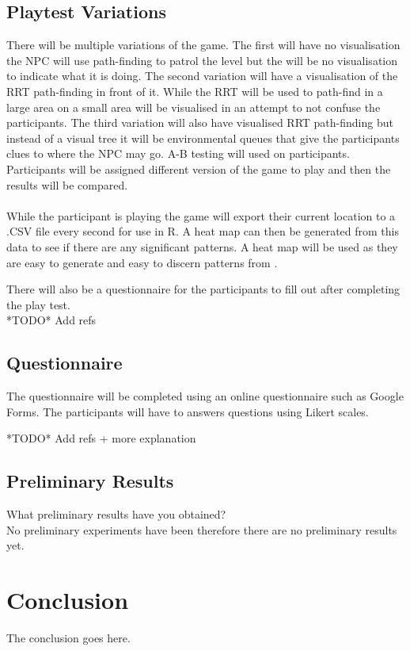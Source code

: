 \documentclass[journal]{IEEEtran}
\begin{document}
\subsection{Playtest Variations}
There will be multiple variations of the game. The first will have no visualisation the NPC will use path-finding to patrol the level but the will be no visualisation to indicate what it is doing.  The second variation will have a visualisation of the RRT path-finding in front of it. While the RRT will be used to path-find in a large area on a small area will be visualised in an attempt to not confuse the participants. The third variation will also have visualised RRT path-finding but instead of a visual tree it will be environmental queues that give the participants clues to where the NPC may go. A-B testing will used on participants. Participants will be assigned different version of the game to play and then the results will be compared. \\
\\
While the participant is playing the game will export their current location to a .CSV file every second for use in R. A heat map can then be generated from this data to see if there are any significant patterns. A heat map will be used as they are easy to generate and easy to discern patterns from \cite{Wallner2015}.

There will also be a questionnaire for the participants to fill out after completing the play test.\\

*TODO* Add refs

\subsection{Questionnaire}
The questionnaire will be completed using an online questionnaire such as Google Forms. The participants will have to answers questions using Likert scales.

*TODO* Add refs + more explanation




\subsection{Preliminary Results}
What preliminary results have you obtained? \\
No preliminary experiments have been therefore there are no preliminary results yet.


\section{Conclusion}
The conclusion goes here.







\end{document}
